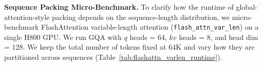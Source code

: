 
\noindent\textbf{Sequence Packing Micro-Benchmark.}
To clarify how the runtime of global-attention-style packing depends on the sequence-length distribution, we micro-benchmark FlashAttention variable-length attention (\texttt{flash\_attn\_var\_len}) on a single H800 GPU. We run GQA with $q$ heads = 64, $kv$ heads = 8, and head dim = 128. We keep the total number of tokens fixed at 64K and vary how they are partitioned across sequences (Table~\ref{tab:flashattn_varlen_runtime}).
\begin{table}[h]
    \centering
    \caption{\texttt{flash\_attn\_var\_len} runtime (ms) under different sequence-length distributions with the same total tokens (64K).}
    \label{tab:flashattn_varlen_runtime}
\end{table}

